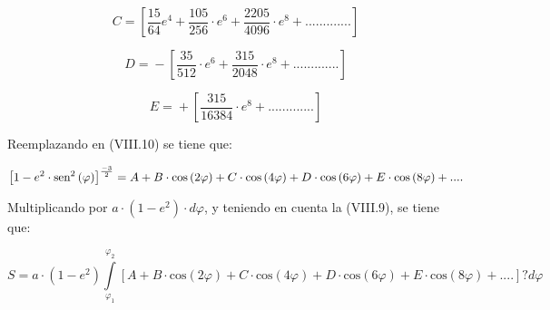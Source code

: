 \documentclass{tufte-book}
\newcommand\normalsubformula[1]{\text{\mathversion{normal}$#1$}}
\begin{document}
\begin{equation*}
{C=\overset{}{{}}\overset{}{{}}\overset{}{{}}\overset{}{{}}\overset{}{{}}\left[\frac{\text{15}}{\text{64}}e^{{4}}+\frac{\text{105}}{\text{256}}\cdot e^{{6}}+\frac{\text{2205}}{\text{4096}}\cdot e^{{8}}+\text{.}\text{.}\text{.}\text{.}\text{.}\text{.}\text{.}\text{.}\text{.}\text{.}\text{.}\text{.}\text{.}\right]}
\end{equation*}

\begin{equation*}
{D=\overset{}{{}}\overset{}{{}}\overset{}{{}}\overset{}{{}}\overset{}{{}}\overset{}{{}}\overset{}{{}}\overset{}{{}}\overset{}{{}}-\left[\frac{\text{35}}{\text{512}}\cdot
e^{{6}}+\frac{\text{315}}{\text{2048}}\cdot
e^{{8}}+\text{.}\text{.}\text{.}\text{.}\text{.}\text{.}\text{.}\text{.}\text{.}\text{.}\text{.}\text{.}\text{.}\right]}
\end{equation*}

\begin{equation*}
{E=\overset{}{{}}\overset{}{{}}\overset{}{{}}\overset{}{{}}\overset{}{{}}\overset{}{{}}\overset{}{{}}\overset{}{{}}\overset{}{{}}\overset{}{{}}\overset{}{{}}\overset{}{{}}\overset{}{{}}\overset{}{{}}\overset{}{{}}+\left[\frac{\text{315}}{\text{16384}}\cdot
e^{{8}}+\text{.}\text{.}\text{.}\text{.}\text{.}\text{.}\text{.}\text{.}\text{.}\text{.}\text{.}\text{.}\text{.}\right]}
\end{equation*}

Reemplazando en (VIII.10) se tiene que:

\begin{equation*}
{\left[1-e^{{2}}\cdot \normalsubformula{\text{sen}}^{{2}}\left(\varphi
\right)\right]^{{\frac{-3}{2}}}=A+B\cdot \text{cos}\left(2\varphi
\right)+C\cdot \text{cos}\left(4\varphi \right)+D\cdot
\text{cos}\left(6\varphi \right)+E\cdot \text{cos}\left(8\varphi
\right)+\text{.}\text{.}\text{.}\text{.}}
\end{equation*}

Multiplicando por  ${a\cdot \left(1-e^{{2}}\right)\cdot \mathit{d\varphi}}$,
y teniendo en cuenta la (VIII.9), se tiene que:

\begin{equation*}
{S=a\cdot \left(1-e^{{2}}\right)\overset{\varphi
_{{2}}}{\underset{{\varphi _{{1}}}}{\int }}{\left[A+B\cdot
\text{cos}\left(2\varphi \right)+C\cdot \text{cos}\left(4\varphi
\right)+D\cdot \text{cos}\left(6\varphi \right)+E\cdot
\text{cos}\left(8\varphi
\right)+\text{.}\text{.}\text{.}\text{.}\right]}{?\mathit{d\varphi }}}
\end{equation*}
\end{document}
